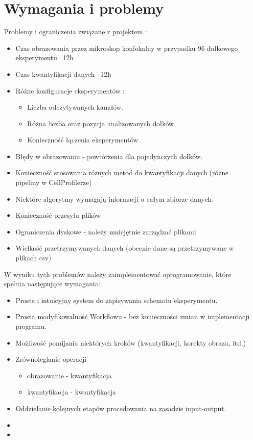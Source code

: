 \section{Wymagania i problemy}

Problemy i ograniczenia związane z projektem : 
\begin{itemize}
\item Czas obrazowania przez mikroskop konfokalny w przypadku 96 dołkowego eksperymentu ~12h
\item Czas kwantyfikacji danych ~12h
\item Różne konfiguracje eksperymentów :
\begin{itemize}
\item Liczba odczytywanych kanałów.
\item Różna liczba oraz pozycja analizowanych dołków
\item Konieczność łączenia eksperymentów
\end{itemize}
\item Błędy w obrazowaniu - powtórzenia dla pojedynczych dołków.
\item Konieczność stosowania różnych metod do kwantyfikacji danych (różne pipeliny w CellProfilerze)
\item Niektóre algorytmy wymagają informacji o całym zbiorze danych.
\item Konieczność przesyłu plików
\item Ograniczenia dyskowe - należy umiejętnie zarządzać plikami
\item Wielkość przetrzymywanych danych (obecnie dane są przetrzymywane w plikach csv)
\end{itemize}

W wyniku tych problemów należy zaimplementować oprogramowanie, które spełnia następujące wymagania:
\begin{itemize}
\item Proste i intuicyjny system do zapisywania schematu eksperymentu.
\item Prosta modyfikowalność Workflowu - bez konieczności zmian w implementacji programu.
\item Możliwość pomijania niektórych kroków (kwantyfikacji, korekty obrazu, itd.)
\item Zrównoleglanie operacji 
\begin{itemize}
\item obrazowanie - kwantyfikacja
\item kwantyfikacja - kwantyfikacja
\end{itemize}
\item Oddzielanie kolejnych etapów procedowania na zasadzie input-output. 
\item 
\item
\end{itemize}


